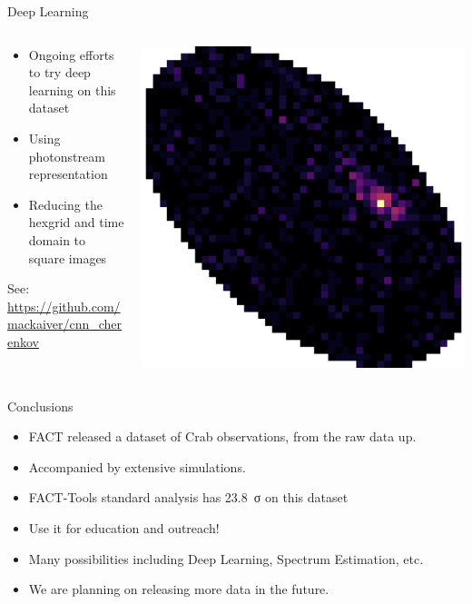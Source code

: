 \documentclass[compress, 9pt, aspectratio=1610, professionalfonts]{beamer}
\begin{document}
\begin{frame}[t]{Deep Learning}
  \begin{columns}[onlytextwidth]
    \begin{column}{0.55\textwidth}
      \begin{itemize}
        \item Ongoing efforts to try deep learning on this dataset
        \item Using photonstream representation
        \item Reducing the hexgrid and time domain to square images
      \end{itemize}

      See: \url{https://github.com/mackaiver/cnn_cherenkov}
    \end{column}
    \begin{column}{0.4\textwidth}
      \includegraphics[width=\textwidth]{images/shower_skewed.png}
    \end{column}
  \end{columns}
\end{frame}

\begin{frame}[c]{Conclusions}
  \begin{itemize}
    \item FACT released a dataset of Crab observations, from the raw data up.
    \item Accompanied by extensive simulations.
    \item FACT-Tools standard analysis has \SI{23.8}{σ} on this dataset
    \item Use it for education and outreach!
    \item Many possibilities including Deep Learning, Spectrum Estimation, etc.
    \item We are planning on releasing more data in the future.
  \end{itemize}
\end{frame}
\end{document}
